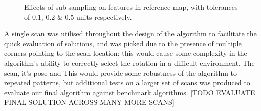 \documentclass[authoryearcitations]{UoYCSproject}
\begin{document}
\begin{figure}[h]
\begin{subfigure}[b]{0.30\textwidth}
\end{subfigure}
\begin{subfigure}[b]{0.30\textwidth}
\end{subfigure}
\begin{subfigure}[b]{0.30\textwidth}
\end{subfigure}
\caption{Effects of sub-sampling on features in reference map, with tolerances of 0.1, 0.2 \& 0.5 units respectively.}
\label{fig:map_density}

\end{figure}
A single scan was utilised throughout the design of the algorithm to facilitate the quick evaluation of solutions, and was picked due to the presence of multiple corners pointing to the scan location: this would cause some complexity in the algorithm's ability to correctly select the rotation in a difficult environment. The scan, it's pose and This would provide some robustness of the algorithm to repeated patterns, but additional tests on a larger set of scans was produced to evaluate our final algorithm against benchmark algorithms. [TODO EVALUATE FINAL SOLUTION ACROSS MANY MORE SCANS]
\end{document}
